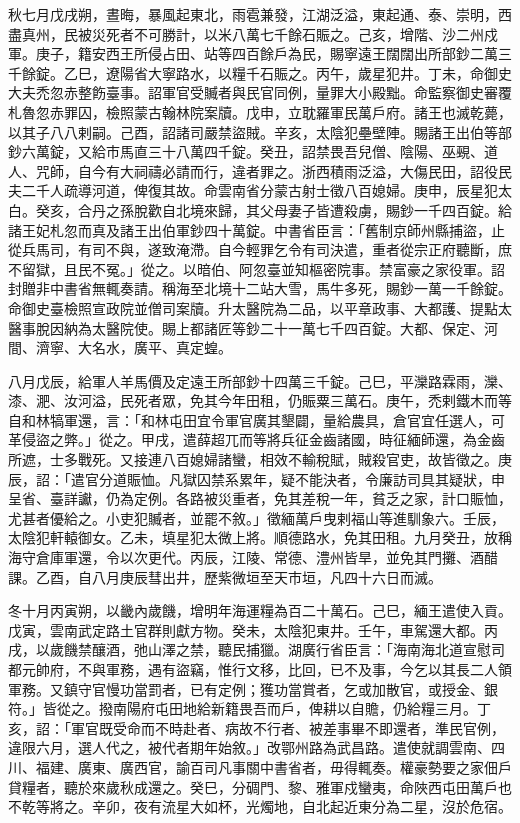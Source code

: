 \begin{pinyinscope}
 秋七月戊戌朔，晝晦，暴風起東北，雨雹兼發，江湖泛溢，東起通、泰、崇明，西盡真州，民被災死者不可勝計，以米八萬七千餘石賑之。己亥，增階、沙二州戍軍。庚子，籍安西王所侵占田、站等四百餘戶為民，賜寧遠王闊闊出所部鈔二萬三千餘錠。乙巳，遼陽省大寧路水，以糧千石賑之。丙午，歲星犯井。丁未，命御史大夫禿忽赤整飭臺事。詔軍官受贓者與民官同例，量罪大小殿黜。命監察御史審覆札魯忽赤罪囚，檢照蒙古翰林院案牘。戊申，立耽羅軍民萬戶府。諸王也滅乾薨，以其子八八剌嗣。己酉，詔諸司嚴禁盜賊。辛亥，太陰犯壘壁陣。賜諸王出伯等部鈔六萬錠，又給市馬直三十八萬四千錠。癸丑，詔禁畏吾兒僧、陰陽、巫覡、道人、咒師，自今有大祠禱必請而行，違者罪之。浙西積雨泛溢，大傷民田，詔役民夫二千人疏導河道，俾復其故。命雲南省分蒙古射士徵八百媳婦。庚申，辰星犯太白。癸亥，合丹之孫脫歡自北境來歸，其父母妻子皆遭殺虜，賜鈔一千四百錠。給諸王妃札忽而真及諸王出伯軍鈔四十萬錠。中書省臣言：「舊制京師州縣捕盜，止從兵馬司，有司不與，遂致淹滯。自今輕罪乞令有司決遣，重者從宗正府聽斷，庶不留獄，且民不冤。」從之。以暗伯、阿忽臺並知樞密院事。禁富豪之家役軍。詔封贈非中書省無輒奏請。稱海至北境十二站大雪，馬牛多死，賜鈔一萬一千餘錠。命御史臺檢照宣政院並僧司案牘。升太醫院為二品，以平章政事、大都護、提點太醫事脫因納為太醫院使。賜上都諸匠等鈔二十一萬七千四百錠。大都、保定、河間、濟寧、大名水，廣平、真定蝗。



 八月戊辰，給軍人羊馬價及定遠王所部鈔十四萬三千錠。己巳，平灤路霖雨，灤、漆、淝、汝河溢，民死者眾，免其今年田租，仍賑粟三萬石。庚午，禿剌鐵木而等自和林犒軍還，言：「和林屯田宜令軍官廣其墾闢，量給農具，倉官宜任選人，可革侵盜之弊。」從之。甲戌，遣薛超兀而等將兵征金齒諸國，時征緬師還，為金齒所遮，士多戰死。又接連八百媳婦諸蠻，相效不輸稅賦，賊殺官吏，故皆徵之。庚辰，詔：「遣官分道賑恤。凡獄囚禁系累年，疑不能決者，令廉訪司具其疑狀，申呈省、臺詳讞，仍為定例。各路被災重者，免其差稅一年，貧乏之家，計口賑恤，尤甚者優給之。小吏犯贓者，並罷不敘。」徵緬萬戶曳剌福山等進馴象六。壬辰，太陰犯軒轅御女。乙未，填星犯太微上將。順德路水，免其田租。九月癸丑，放稱海守倉庫軍還，令以次更代。丙辰，江陵、常德、澧州皆旱，並免其門攤、酒醋課。乙酉，自八月庚辰彗出井，歷紫微垣至天市垣，凡四十六日而滅。



 冬十月丙寅朔，以畿內歲饑，增明年海運糧為百二十萬石。己巳，緬王遣使入貢。戊寅，雲南武定路土官群則獻方物。癸未，太陰犯東井。壬午，車駕還大都。丙戌，以歲饑禁釀酒，弛山澤之禁，聽民捕獵。湖廣行省臣言：「海南海北道宣慰司都元帥府，不與軍務，遇有盜竊，惟行文移，比回，已不及事，今乞以其長二人領軍務。又鎮守官慢功當罰者，已有定例；獲功當賞者，乞或加散官，或授金、銀符。」皆從之。撥南陽府屯田地給新籍畏吾而戶，俾耕以自贍，仍給糧三月。丁亥，詔：「軍官既受命而不時赴者、病故不行者、被差事畢不即還者，準民官例，違限六月，選人代之，被代者期年始敘。」改鄂州路為武昌路。遣使就調雲南、四川、福建、廣東、廣西官，諭百司凡事關中書省者，毋得輒奏。權豪勢要之家佃戶貸糧者，聽於來歲秋成還之。癸巳，分碉門、黎、雅軍戍蠻夷，命陜西屯田萬戶也不乾等將之。辛卯，夜有流星大如杯，光燭地，自北起近東分為二星，沒於危宿。




\end{pinyinscope}
